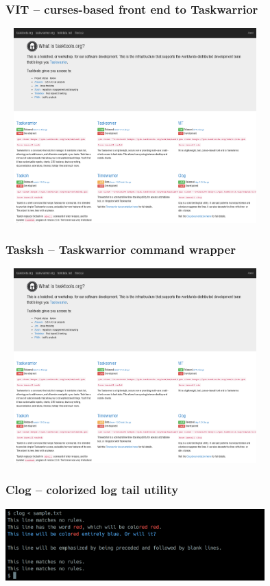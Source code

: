 \documentclass[t,handout]{beamer}
\begin{document}
\begin{frame}\frametitle{VIT -- curses-based front end to Taskwarrior}
    \begin{center}
        \href{http://tasktools.org/projects/vit.html}{\includegraphics[width=10cm,height=7.5cm]{tasktools-org.png}}
    \end{center}
\end{frame}

\begin{frame}\frametitle{Tasksh -- Taskwarrior command wrapper}
    \begin{center}
        \href{http://tasktools.org/projects/tasksh.html}{\includegraphics[width=10cm,height=7.5cm]{tasktools-org.png}}
    \end{center}
\end{frame}

\begin{frame}\frametitle{Clog -- colorized log tail utility}
    \vfill
    \begin{center}
        \href{http://tasktools.org/projects/clog.html}{\includegraphics[width=10cm]{clog.png}}
    \end{center}
    \vfill
\end{frame}
\end{document}
